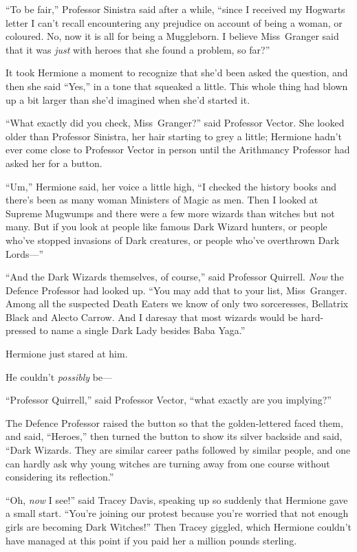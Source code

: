 “To be fair,” Professor Sinistra said after a while, “since I received my Hogwarts letter I can’t recall encountering any prejudice on account of being a woman, or coloured. No, now it is all for being a Muggleborn. I believe Miss~Granger said that it was \emph{just} with heroes that she found a problem, so far?”

It took Hermione a moment to recognize that she’d been asked the question, and then she said “Yes,” in a tone that squeaked a little. This whole thing had blown up a bit larger than she’d imagined when she’d started it.

“What exactly did you check, Miss~Granger?” said Professor Vector. She looked older than Professor Sinistra, her hair starting to grey a little; Hermione hadn’t ever come close to Professor Vector in person until the Arithmancy Professor had asked her for a button.

“Um,” Hermione said, her voice a little high, “I checked the history books and there’s been as many woman Ministers of Magic as men. Then I looked at Supreme Mugwumps and there were a few more wizards than witches but not many. But if you look at people like famous Dark Wizard hunters, or people who’ve stopped invasions of Dark creatures, or people who’ve overthrown Dark Lords—”

“And the Dark Wizards themselves, of course,” said Professor Quirrell. \emph{Now} the Defence Professor had looked up. “You may add that to your list, Miss~Granger. Among all the suspected Death Eaters we know of only two sorceresses, Bellatrix Black and Alecto Carrow. And I daresay that most wizards would be hard-pressed to name a single Dark Lady besides Baba Yaga.”

Hermione just stared at him.

He couldn’t \emph{possibly} be—

“Professor Quirrell,” said Professor Vector, “what exactly are you implying?”

The Defence Professor raised the button so that the golden-lettered \SPHEW faced them, and said, “Heroes,” then turned the button to show its silver backside and said, “Dark Wizards. They are similar career paths followed by similar people, and one can hardly ask why young witches are turning away from one course without considering its reflection.”

“Oh, \emph{now} I see!” said Tracey Davis, speaking up so suddenly that Hermione gave a small start. “You’re joining our protest because you’re worried that not enough girls are becoming Dark Witches!” Then Tracey giggled, which Hermione couldn’t have managed at this point if you paid her a million pounds sterling.

